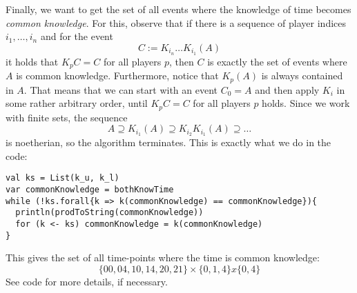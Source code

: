 \documentclass{scrartcl}
\begin{document}
Finally, we want to get the set of all events where
the knowledge of time becomes \emph{common knowledge}.
For this, observe that if there is a sequence of player
indices $i_1, \dots, i_n$ and for the event
\[
  C := K_{i_n}\dots K_{i_1}(A)
\]
it holds that $K_p C = C$ for all players $p$, then
$C$ is exactly the set of events where $A$ is common
knowledge. Furthermore, notice that  $K_p(A)$ is 
always contained in $A$. That means that we can 
start with an event $C_0 = A$ and then apply $K_i$ in some rather arbitrary order, until 
$K_p C = C$ for all players $p$ holds. 
Since we work with finite sets, the sequence
\[
A \supseteq K_{i_1}(A) \supseteq K_{i_2}K_{i_1}(A)
  \supseteq \dots
\]
is noetherian, so the algorithm terminates.
This is exactly what we do in the code:
\begin{lstlisting}
val ks = List(k_u, k_l)
var commonKnowledge = bothKnowTime
while (!ks.forall{k => k(commonKnowledge) == commonKnowledge}){
  println(prodToString(commonKnowledge))
  for (k <- ks) commonKnowledge = k(commonKnowledge)
}
\end{lstlisting}
This gives the set of all time-points where the time
is common knowledge:
\[
  \{00,04,10,14,20,21\} \times \{0,1,4\} x \{0,4\}
\]
See code for more details, if necessary.
\end{document}
